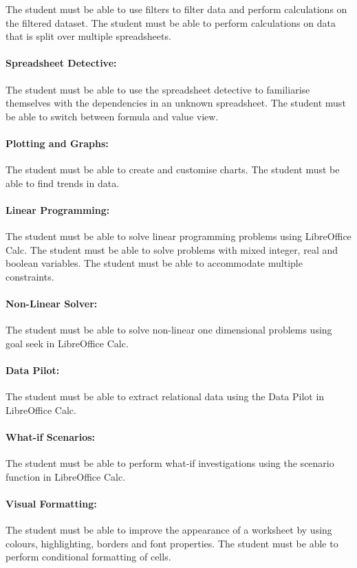                 The student must be able to use filters to filter data and perform
                calculations on the filtered dataset. The student must be able to
                perform calculations on data that is split over multiple
                spreadsheets.

            \paragraph{Spreadsheet Detective:}
                The student must be able to use the spreadsheet detective to
                familiarise themselves with the dependencies in an unknown
                spreadsheet. The student must be able to switch between formula
                and value view.

            \paragraph{Plotting and Graphs:}
                The student must be able to create and customise charts. The
                student must be able to find trends in data.

            \paragraph{Linear Programming:}
                The student must be able to solve linear programming problems
                using LibreOffice Calc. The student must be able to solve
                problems with mixed integer, real and boolean variables. The
                student must be able to accommodate multiple constraints.

            \paragraph{Non-Linear Solver:}
                The student must be able to solve non-linear one dimensional
                problems using goal seek in LibreOffice Calc.

            \paragraph{Data Pilot:}
                The student must be able to extract relational data using the Data
                Pilot in LibreOffice Calc.

            \paragraph{What-if Scenarios:}
                The student must be able to perform what-if investigations using
                the scenario function in LibreOffice Calc.

            \paragraph{Visual Formatting:}
                The student must be able to improve the appearance of a worksheet
                by using colours, highlighting, borders and font properties. The
                student must be able to perform conditional formatting of cells.

